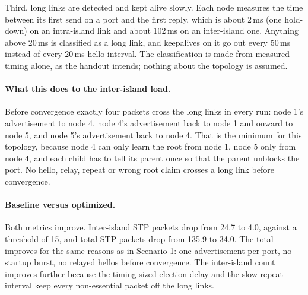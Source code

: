 \documentclass[11pt]{article}
\begin{document}
Third, long links are detected and kept alive slowly.
Each node measures the time between its first send on a port and the first reply, which is about 2\,ms (one hold-down) on an intra-island link and about 102\,ms on an inter-island one.
Anything above 20\,ms is classified as a long link, and keepalives on it go out every 50\,ms instead of every 20\,ms hello interval.
The classification is made from measured timing alone, as the handout intends; nothing about the topology is assumed.

\paragraph{What this does to the inter-island load.}
Before convergence exactly four packets cross the long links in every run: node 1's advertisement to node 4, node 4's advertisement back to node 1 and onward to node 5, and node 5's advertisement back to node 4.
That is the minimum for this topology, because node 4 can only learn the root from node 1, node 5 only from node 4, and each child has to tell its parent once so that the parent unblocks the port.
No hello, relay, repeat or wrong root claim crosses a long link before convergence.

\paragraph{Baseline versus optimized.}
Both metrics improve.
Inter-island STP packets drop from 24.7 to 4.0, against a threshold of 15, and total STP packets drop from 135.9 to 34.0.
The total improves for the same reasons as in Scenario 1: one advertisement per port, no startup burst, no relayed hellos before convergence.
The inter-island count improves further because the timing-sized election delay and the slow repeat interval keep every non-essential packet off the long links.
\end{document}
